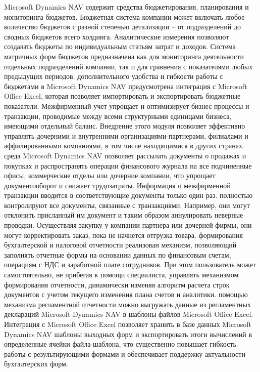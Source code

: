 \documentclass[14pt,a4paper]{reportmod}
\begin{document}
\par Microsoft Dynamics NAV содержит средства бюджетирования, планирования и мониторинга бюджетов. Бюджетная система компании может включать любое количество бюджетов с разной степенью детализации – от подразделений до сводных бюджетов всего холдинга. Аналитические измерения позволяют создавать бюджеты по индивидуальным статьям затрат и доходов. Система матричных форм бюджетов предназначена как для мониторинга деятельности отдельных подразделений компании, так и для сравнения с показателями любых предыдущих периодов.
 дополнительного удобства и гибкости работы с бюджетами в Microsoft Dynamics NAV предусмотрена интеграция с Microsoft Office Excel, которая позволяет импортировать и экспортировать бюджетные показатели.
Межфирменный учет упрощает и оптимизирует бизнес-процессы и транзакции, проводимые между всеми структурными единицами бизнеса, имеющими отдельный баланс. Внедрение этого модуля позволяет эффективно управлять дочерними и внутренними организациями-партнерами, филиалами и аффилированными компаниями, в том числе находящимися в других странах.
 среда Microsoft Dynamics NAV позволяет рассылать документы о продажах и покупках и распространять операции финансового журнала на все подчиненные офисы, коммерческие отделы или дочерние компании, что упрощает документооборот и снижает трудозатраты. Информация о межфирменной транзакции вводится в соответствующие документы только один раз.
 полностью контролируют все документы, связанные с транзакциями. Например, они могут отклонить присланный им документ и таким образом аннулировать неверные проводки. Осуществляя закупку у компании-партнера или дочерней фирмы, они могут корректировать заказ, пока не начнется отгрузка товара.
 формирования бухгалтерской и налоговой отчетности реализован механизм, позволяющий заполнять отчетные формы на основании данных по финансовым счетам, операциям с НДС и заработной плате сотрудников. При этом пользователь может самостоятельно, не прибегая к помощи специалиста, управлять механизмом формирования отчетности, динамически изменяя алгоритм расчета строк документов с учетом текущего изменения плана счетов и аналитики.
 помощью механизма регламентной отчетности можно выгружать данные из регламентных деклараций Microsoft Dynamics NAV в шаблоны файлов Microsoft Office Excel. Интеграция с Microsoft Office Excel позволяет хранить в базе данных Microsoft Dynamics NAV шаблоны выходных форм и экспортировать итоги вычислений в определенные ячейки файла-шаблона, что существенно повышает гибкость работы с результирующими формами и обеспечивает поддержку актуальности бухгалтерских форм.
\end{document}
